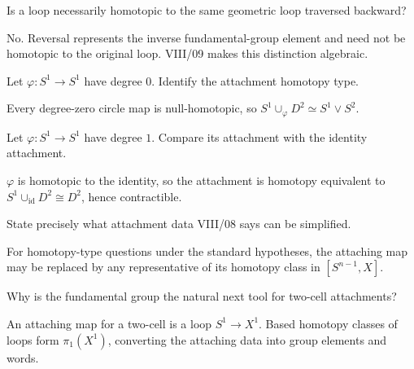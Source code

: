 \begin{problem}\label{prob:viii08-16}
Is a loop necessarily homotopic to the same geometric loop traversed backward?
\end{problem}
\begin{solution}
No.  Reversal represents the inverse fundamental-group element and need not be homotopic to the original loop.  VIII/09 makes this distinction algebraic.
\end{solution}

\begin{problem}\label{prob:viii08-17}
Let \(\varphi:S^1\to S^1\) have degree \(0\). Identify the attachment homotopy type.
\end{problem}
\begin{solution}
Every degree-zero circle map is null-homotopic, so \(S^1\cup_\varphi D^2\simeq S^1\vee S^2\).
\end{solution}

\begin{problem}\label{prob:viii08-18}
Let \(\varphi:S^1\to S^1\) have degree \(1\). Compare its attachment with the identity attachment.
\end{problem}
\begin{solution}
\(\varphi\) is homotopic to the identity, so the attachment is homotopy equivalent to \(S^1\cup_{\operatorname{id}}D^2\cong D^2\), hence contractible.
\end{solution}

\begin{problem}\label{prob:viii08-19}
State precisely what attachment data VIII/08 says can be simplified.
\end{problem}
\begin{solution}
For homotopy-type questions under the standard hypotheses, the attaching map may be replaced by any representative of its homotopy class in \([S^{n-1},X]\).
\end{solution}

\begin{problem}[Bridge to \(\pi_1\)]\label{prob:viii08-20}
Why is the fundamental group the natural next tool for two-cell attachments?
\end{problem}
\begin{solution}
An attaching map for a two-cell is a loop \(S^1\to X^1\).  Based homotopy classes of loops form \(\pi_1(X^1)\), converting the attaching data into group elements and words.
\end{solution}
